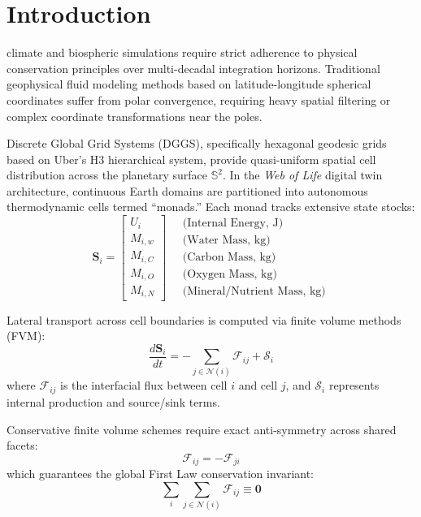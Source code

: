 \documentclass[10pt,journal,compsoc]{IEEEtran}
\begin{document}
\section{Introduction}
 climate and biospheric simulations require strict adherence to physical conservation principles over multi-decadal integration horizons. Traditional geophysical fluid modeling methods based on latitude-longitude spherical coordinates suffer from polar convergence, requiring heavy spatial filtering or complex coordinate transformations near the poles.

Discrete Global Grid Systems (DGGS), specifically hexagonal geodesic grids based on Uber's H3 hierarchical system, provide quasi-uniform spatial cell distribution across the planetary surface $\mathbb{S}^2$. In the \textit{Web of Life} digital twin architecture, continuous Earth domains are partitioned into autonomous thermodynamic cells termed ``monads.'' Each monad tracks extensive state stocks:
\begin{equation}
\mathbf{S}_i = \begin{bmatrix} U_i \\ M_{i, w} \\ M_{i, C} \\ M_{i, O} \\ M_{i, N} \end{bmatrix} \quad \begin{array}{l} \text{(Internal Energy, J)} \\ \text{(Water Mass, kg)} \\ \text{(Carbon Mass, kg)} \\ \text{(Oxygen Mass, kg)} \\ \text{(Mineral/Nutrient Mass, kg)} \end{array}
\end{equation}

Lateral transport across cell boundaries is computed via finite volume methods (FVM):
\begin{equation}
\frac{d \mathbf{S}_i}{dt} = -\sum_{j \in \mathcal{N}(i)} \boldsymbol{\mathcal{F}}_{ij} + \boldsymbol{\mathcal{S}}_i
\end{equation}
where $\boldsymbol{\mathcal{F}}_{ij}$ is the interfacial flux between cell $i$ and cell $j$, and $\boldsymbol{\mathcal{S}}_i$ represents internal production and source/sink terms.

Conservative finite volume schemes require exact anti-symmetry across shared facets:
\begin{equation}
\boldsymbol{\mathcal{F}}_{ij} = -\boldsymbol{\mathcal{F}}_{ji}
\end{equation}
which guarantees the global First Law conservation invariant:
\begin{equation}
\sum_{i} \sum_{j \in \mathcal{N}(i)} \boldsymbol{\mathcal{F}}_{ij} \equiv \mathbf{0}
\end{equation}
\end{document}
